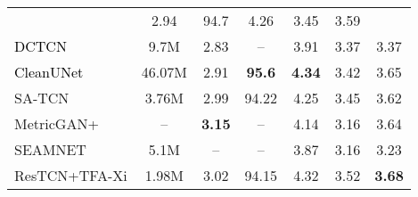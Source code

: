 \begin{table}[!htbp]
{\begin{tabular}{l||c||ccccc }
& 2.94 & 94.7 & 4.26 & 3.45 & 3.59 \\
\textcolor{black}{DCTCN \cite{dctcn}} & 9.7M 
& 2.83 & -- & 3.91 & 3.37 & 3.37 \\
\textcolor{black}{CleanUNet \cite{cleanunet}} & 46.07M 
& 2.91 & \textbf{95.6} & \textbf{4.34} & 3.42 & 3.65 \\
SA-TCN \cite{sa-tcn} & 3.76M   
& 2.99 & 94.22 & 4.25 & 3.45 & 3.62  \\
MetricGAN+ \cite{metricgan+} & --   
& \textbf{3.15} & -- & 4.14 & 3.16 & 3.64  \\
SEAMNET\cite{seamnet} & 5.1M   
& -- & -- & 3.87 & 3.16 & 3.23  \\
ResTCN+TFA-Xi & 1.98M   
& 3.02 & 94.15 & 4.32 & 3.52 & \textbf{3.68}  \\
\hline  
\end{tabular}}
\label{demand}
\vspace{-2.0em}
\end{table}